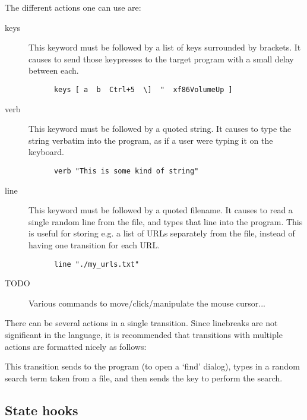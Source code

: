 \documentclass[11pt,a4paper]{article}
\begin{document}
The different actions one can use are:

\begin{description}

  \item[keys]{
    This keyword must be followed by a list of keys surrounded by
    brackets. It causes  to send those keypresses to the
    target program with a small delay between each.
    \begin{lstlisting}
      keys [ a  b  Ctrl+5  \]  "  xf86VolumeUp ]
    \end{lstlisting}
  }

  \item[verb]{
    This keyword must be followed by a quoted string.  It causes
     to type the string verbatim into the program, as if
    a user were typing it on the keyboard.
    \begin{lstlisting}
      verb "This is some kind of string"
    \end{lstlisting}
  }

  \item[line]{
    This keyword must be followed by a quoted filename. It causes
     to read a single random line from the file, and
    types that line into the program. This is useful for storing e.g.
    a list of URLs separately from the  file, instead of
    having one  transition for each URL.
    \begin{lstlisting}
      line "./my_urls.txt"
    \end{lstlisting}
  }

  \item[TODO]{
      Various commands to move/click/manipulate the mouse cursor...
    }

\end{description}

There can be several actions in a single transition. Since linebreaks
are not significant in the language, it is recommended that
transitions with multiple actions are formatted nicely as follows:


This transition sends  to the program (to open a `find'
dialog), types in a random search term taken from a file, and then
sends the  key to perform the search.

\subsection{State hooks\label{sec:state-hooks}}
\end{document}
